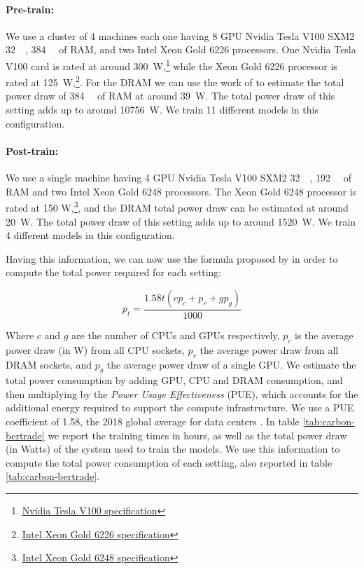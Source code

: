 \paragraph{Pre-train:} We use a cluster of 4 machines each one having \num{8} GPU Nvidia Tesla V100 SXM2 \qty{32}{\gibi\byte}, \qty{384}{\gibi\byte} of RAM, and two Intel Xeon Gold 6226 processors. One Nvidia Tesla V100 card is rated at around \qty{300}{\watt},\footnote{\href{https://www.nvidia.com/en-us/data-center/v100/}{ Nvidia Tesla V100 specification}} while the Xeon Gold 6226 processor is rated at \qty{125}{\watt},\footnote{\href{https://ark.intel.com/content/www/us/en/ark/products/193957/intel-xeon-gold-6226-processor-19-25m-cache-2-70-ghz.html}{Intel Xeon Gold 6226 specification}}. For the DRAM we can use the work of \citet{desrochers-etal-2016-a} to estimate the total power draw of \qty{384}{\gibi\byte} of RAM at around \qty{39}{\watt}. The total power draw of this setting adds up to around \qty{10756}{\watt}. We train \num{11} different models in this configuration.

\paragraph{Post-train:} We use a single machine having \num{4} GPU Nvidia Tesla V100 SXM2 \qty{32}{\gibi\byte}, \qty{192}{\gibi\byte} of RAM and two Intel Xeon Gold 6248 processors. The Xeon Gold 6248 processor is rated at 150 W,\footnote{\href{https://ark.intel.com/content/www/us/en/ark/products/192446/intel-xeon-gold-6248-processor-27-5m-cache-2-50-ghz.html}{Intel Xeon Gold 6248 specification}}, and the DRAM total power draw can be estimated at around \qty{20}{\watt}. The total power draw of this setting adds up to around \qty{1520}{\watt}. We train \num{4} different models in this configuration.

Having this information, we can now use the formula proposed by \citet{strubell-etal-2019-energy} in order to compute the total power required for each setting:

\begin{equation*}
    p_t = \frac{1.58t(cp_{c} + p_r + gp_g)}{1000}
\end{equation*}

Where $c$ and $g$ are the number of CPUs and GPUs respectively, $p_c$ is the average power draw (in \unit{\watt}) from all CPU sockets, $p_r$ the average power draw from all DRAM sockets, and $p_g$ the average power draw of a single GPU. We estimate the total power consumption by adding GPU, CPU and DRAM consumption, and then multiplying by the \emph{Power Usage Effectiveness} (PUE), which accounts for the additional energy required to support the compute infrastructure. We use a PUE coefficient of \num{1.58}, the 2018 global average for data centers \citep{strubell-etal-2019-energy}. In table \ref{tab:carbon-bertrade} we report the training times in hours, as well as the total power draw (in Watts) of the system used to train the models. We use this information to compute the total power consumption of each setting, also reported in table \ref{tab:carbon-bertrade}.

